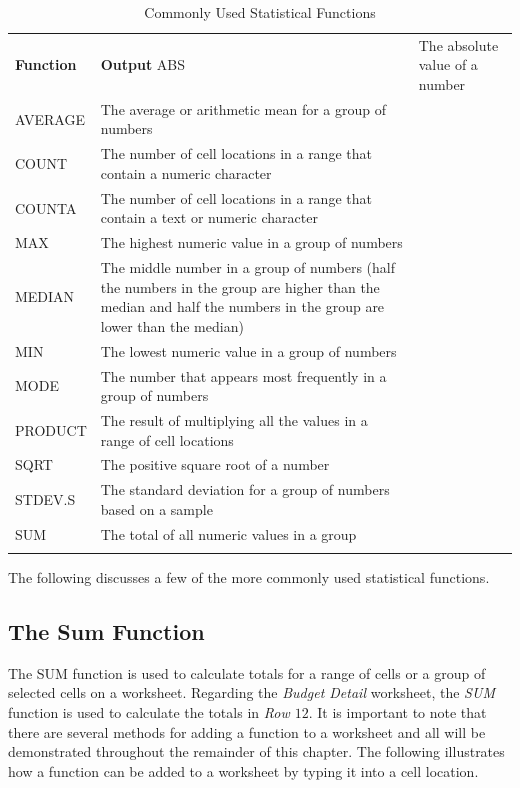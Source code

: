 \begin{table}[H]
	{\small
		\begin{longtable}{L{0.75in}L{3.50in}} %
			\textbf{Function} & \textbf{Output} \endhead
			\hline
			ABS & The absolute value of a number\\
			AVERAGE & The average or arithmetic mean for a group of numbers\\
			COUNT & The number of cell locations in a range that contain a numeric character\\
			COUNTA & The number of cell locations in a range that contain a text or numeric character\\
			MAX & The highest numeric value in a group of numbers\\
			MEDIAN & The middle number in a group of numbers (half the numbers in the group are higher than the median and half the numbers in the group are lower than the median)\\
			MIN & The lowest numeric value in a group of numbers\\
			MODE & The number that appears most frequently in a group of numbers\\
			PRODUCT & The result of multiplying all the values in a range of cell locations\\
			SQRT & The positive square root of a number\\
			STDEV.S & The standard deviation for a group of numbers based on a sample\\
			SUM & The total of all numeric values in a group\\
			\caption{Commonly Used Statistical Functions}
			\label{02:tab04}
		\end{longtable}
	} %
\end{table}

The following discusses a few of the more commonly used statistical functions.

\subsection{The Sum Function}

The SUM function is used to calculate totals for a range of cells or a group of selected cells on a worksheet. Regarding the \textit{Budget Detail} worksheet, the \textit{SUM} function is used to calculate the totals in \textit{Row $ 12 $}. It is important to note that there are several methods for adding a function to a worksheet and all will be demonstrated throughout the remainder of this chapter. The following illustrates how a function can be added to a worksheet by typing it into a cell location.

